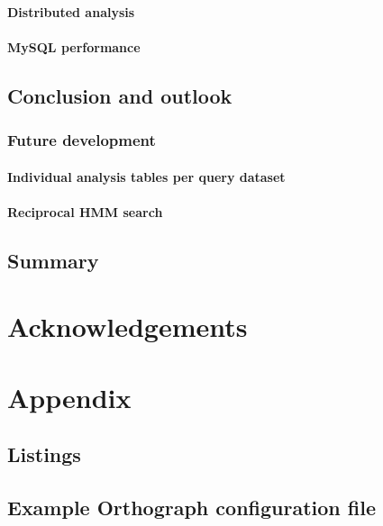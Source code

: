 \documentclass[a4paper,12pt]{scrreprt}
\newcommand{\pname}{Orthograph\xspace}
\begin{document}
		\subsubsection{Distributed analysis}
			
		\subsubsection{MySQL performance}
			
	\section{Conclusion and outlook}
		
		\subsection{Future development}
			
			\subsubsection{Individual analysis tables per query dataset}
				
			\subsubsection{Reciprocal HMM search}
				
	\section{Summary}

\clearpage

%
%
{}
\chapter*{Acknowledgements}
	\clearpage

%
%
{}
\footnotesize


\normalsize
\clearpage

%
%
\appendix
\chapter{Appendix}
	\section{Listings}
		
	\clearpage
	\section{Example \pname configuration file}
		
\end{document}
